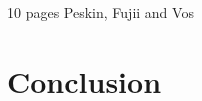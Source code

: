 \documentclass[%
 reprint,
nofootinbib,
 amsmath,amssymb,
 aps,
]{revtex4-1}
\begin{document}

  10 pages Peskin, Fujii and Vos
\section{\label{sec:conclusion}Conclusion}




%

\end{document}
